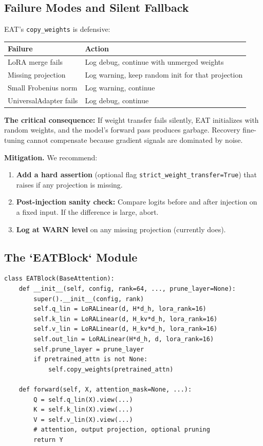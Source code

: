 \subsection{Failure Modes and Silent Fallback}

EAT's \texttt{copy\_weights} is defensive:

\begin{table}[H]
\centering
\small
\begin{tabular}{ll}
\toprule
\textbf{Failure} & \textbf{Action} \\
\midrule
LoRA merge fails & Log debug, continue with unmerged weights \\
Missing projection & Log warning, keep random init for that projection \\
Small Frobenius norm & Log warning, continue \\
UniversalAdapter fails & Log debug, continue \\
\bottomrule
\end{tabular}
\end{table}

\textbf{The critical consequence:} If weight transfer fails silently, EAT 
initializes with random weights, and the model's forward pass produces 
garbage. Recovery fine-tuning cannot compensate because gradient signals 
are dominated by noise.

\textbf{Mitigation.} We recommend:

\begin{enumerate}
\item \textbf{Add a hard assertion} (optional flag \texttt{strict\_weight\_transfer=True})
  that raises if any projection is missing.
\item \textbf{Post-injection sanity check:} Compare logits before and after
  injection on a fixed input. If the difference is large, abort.
\item \textbf{Log at WARN level} on any missing projection (currently does).

\end{enumerate}
\subsection{The `EATBlock` Module}

\begin{lstlisting}
class EATBlock(BaseAttention):
    def __init__(self, config, rank=64, ..., prune_layer=None):
        super().__init__(config, rank)
        self.q_lin = LoRALinear(d, H*d_h, lora_rank=16)
        self.k_lin = LoRALinear(d, H_kv*d_h, lora_rank=16)
        self.v_lin = LoRALinear(d, H_kv*d_h, lora_rank=16)
        self.out_lin = LoRALinear(H*d_h, d, lora_rank=16)
        self.prune_layer = prune_layer
        if pretrained_attn is not None:
            self.copy_weights(pretrained_attn)
    
    def forward(self, X, attention_mask=None, ...):
        Q = self.q_lin(X).view(...)
        K = self.k_lin(X).view(...)
        V = self.v_lin(X).view(...)
        # attention, output projection, optional pruning
        return Y
\end{lstlisting}

